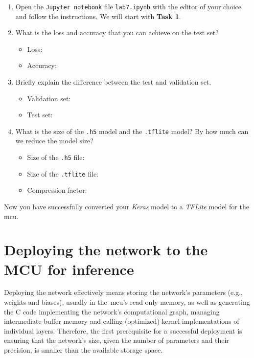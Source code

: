\documentclass[parskip=half,notes,cadrem,toolver]{iisvlsi}
\begin{document}
\begin{studtask}
    \begin{enumerate}
        \item Open the \texttt{Jupyter notebook} file \texttt{lab7.ipynb} with the editor of your choice and follow the instructions. We will start with \textbf{Task 1}. 
        \item What is the loss and accuracy that you can achieve on the test set? 
        \begin{itemize}
            \item Loss: \answerrule
            \item Accuracy: \answerrule
        \end{itemize}
        \item Briefly explain the difference between the test and validation set. 
        \begin{itemize}
            \item Validation set: \answerrule
            \item Test set: \answerrule
        \end{itemize}
        \item What is the size of the \texttt{.h5} model and the \texttt{.tflite} model? By how much can we reduce the model size?
        \begin{itemize}
            \item Size of the \texttt{.h5} file: \answerrule
            \item Size of the \texttt{.tflite} file: \answerrule
            \item Compression factor: \answerrule \\
        \end{itemize}
    \end{enumerate}
    \answerrule
\end{studtask}

Now you have successfully converted your \textit{Keras} model to a \textit{TFLite} model for the \gls{mcu}. 

\section{Deploying the network to the MCU for inference}

Deploying the network effectively means storing the network's parameters (e.g., weights and biases), usually in the~\gls{mcu}'s read-only memory, as well as generating the C code implementing the network's computational graph, managing intermediate buffer memory and calling (optimized) kernel implementations of individual layers. Therefore, the first prerequisite for a successful deployment is ensuring that the network's size, given the number of parameters and their precision, is smaller than the available storage space. 
\end{document}
